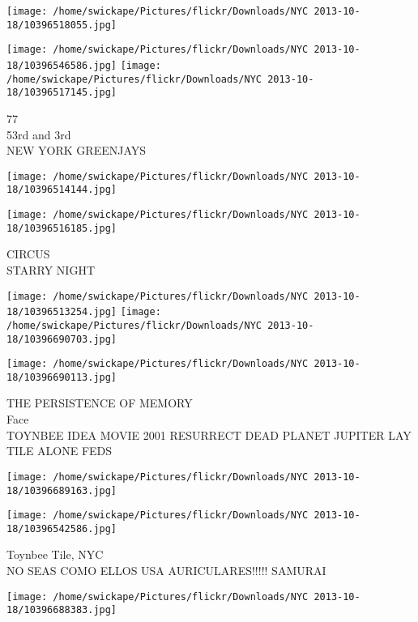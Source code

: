 \documentclass[10pt,letterpaper]{article}
\begin{document}
\texttt{[image: /home/swickape/Pictures/flickr/Downloads/NYC 2013-10-18/10396518055.jpg]}

\vspace{0.25in}
\texttt{[image: /home/swickape/Pictures/flickr/Downloads/NYC 2013-10-18/10396546586.jpg]}
\texttt{[image: /home/swickape/Pictures/flickr/Downloads/NYC 2013-10-18/10396517145.jpg]}

77\\
53rd and 3rd\\
NEW YORK GREENJAYS\\
\pagebreak

\texttt{[image: /home/swickape/Pictures/flickr/Downloads/NYC 2013-10-18/10396514144.jpg]}

\vspace{0.25in}
\texttt{[image: /home/swickape/Pictures/flickr/Downloads/NYC 2013-10-18/10396516185.jpg]}

CIRCUS\\
STARRY NIGHT\\
\pagebreak

\texttt{[image: /home/swickape/Pictures/flickr/Downloads/NYC 2013-10-18/10396513254.jpg]}
\texttt{[image: /home/swickape/Pictures/flickr/Downloads/NYC 2013-10-18/10396690703.jpg]}

\vspace{0.25in}
\texttt{[image: /home/swickape/Pictures/flickr/Downloads/NYC 2013-10-18/10396690113.jpg]}

THE PERSISTENCE OF MEMORY\\
Face\\
TOYNBEE IDEA MOVIE 2001 RESURRECT DEAD PLANET JUPITER LAY TILE ALONE FEDS\\
\pagebreak

\texttt{[image: /home/swickape/Pictures/flickr/Downloads/NYC 2013-10-18/10396689163.jpg]}

\vspace{0.25in}
\texttt{[image: /home/swickape/Pictures/flickr/Downloads/NYC 2013-10-18/10396542586.jpg]}

Toynbee Tile, NYC\\
NO SEAS COMO ELLOS USA AURICULARES!!!!! SAMURAI\\
\pagebreak

\texttt{[image: /home/swickape/Pictures/flickr/Downloads/NYC 2013-10-18/10396688383.jpg]}
\end{document}
